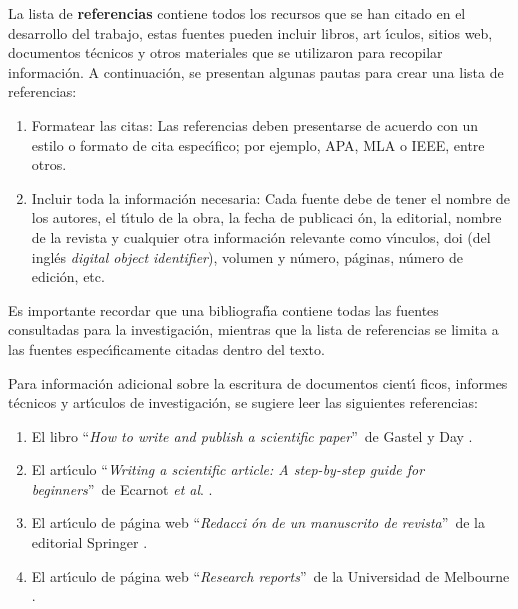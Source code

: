 \bigskip

La lista de \textbf{referencias} contiene todos los recursos que se han
citado en el desarrollo del trabajo, estas fuentes pueden incluir libros, art%
\'{\i}culos, sitios web, documentos t\'{e}cnicos y otros materiales que se
utilizaron para recopilar informaci\'{o}n. A continuaci\'{o}n, se presentan
algunas pautas para crear una lista de referencias:

\begin{enumerate}
\item Formatear las citas: Las referencias deben presentarse de acuerdo con
un estilo o formato de cita espec\'{\i}fico; por ejemplo, APA, MLA o IEEE,
entre otros.

\item Incluir toda la informaci\'{o}n necesaria: Cada fuente debe de tener
el nombre de los autores, el t\'{\i}tulo de la obra, la fecha de publicaci%
\'{o}n, la editorial, nombre de la revista y cualquier otra informaci\'{o}n
relevante como v\'{\i}nculos, doi (del ingl\'{e}s \textit{digital object
identifier}), volumen y n\'{u}mero, p\'{a}ginas, n\'{u}mero de edici\'{o}n,
etc.
\end{enumerate}

Es importante recordar que una bibliograf\'{\i}a contiene todas las fuentes
consultadas para la investigaci\'{o}n, mientras que la lista de referencias
se limita a las fuentes espec\'{\i}ficamente citadas dentro del texto.

\bigskip

Para informaci\'{o}n adicional sobre la escritura de documentos cient\'{\i}%
ficos, informes t\'{e}cnicos y art\'{\i}culos de investigaci\'{o}n, se
sugiere leer las siguientes referencias:

\begin{enumerate}
\item El libro \textquotedblleft \textit{How to write and publish a
scientific paper}\textquotedblright\ de Gastel y Day \cite{Gastel(2022)}.

\item El art\'{\i}culo \textquotedblleft \textit{Writing a scientific
article: A step-by-step guide for beginners}\textquotedblright\ de Ecarnot 
\textit{et al}. \cite{Ecarnot(2015)}.

\item El art\'{\i}culo de p\'{a}gina web \textquotedblleft \textit{Redacci%
\'{o}n de un manuscrito de revista}\textquotedblright\ de la editorial
Springer \cite{springer}.

\item El art\'{\i}culo de p\'{a}gina web \textquotedblleft \textit{Research
reports}\textquotedblright\ de la Universidad de Melbourne \cite{reports}.
\end{enumerate}

